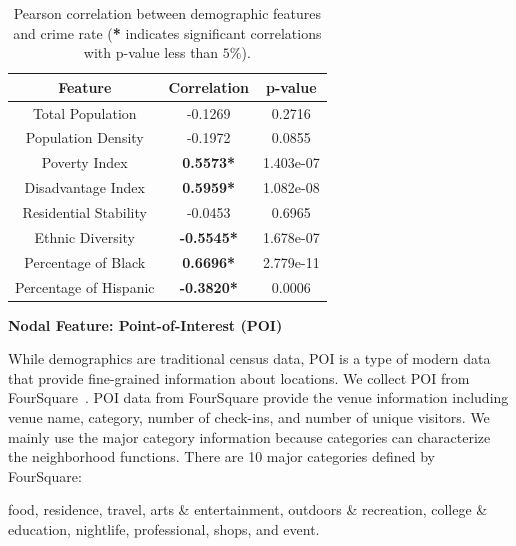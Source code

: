 \begin{table}[h]
\centering
\caption{Pearson correlation between demographic features  and crime rate (\textbf{*} indicates significant correlations with p-value less than $5\%$). }
\begin{tabular}{|c||c|c|}
\hline
Feature & Correlation & p-value \\ \hline \hline
Total Population & -0.1269 &  0.2716 \\ \hline
Population Density & -0.1972  & 0.0855 \\ \hline
Poverty Index & \textbf{0.5573*} & 1.403e-07 \\ \hline
Disadvantage Index & \textbf{0.5959*} & 1.082e-08 \\ \hline
Residential Stability  & -0.0453 &  0.6965 \\ \hline
Ethnic Diversity & \textbf{-0.5545*} &  1.678e-07 \\ \hline
Percentage of Black & \textbf{0.6696*} &  2.779e-11 \\ \hline
Percentage of Hispanic  & \textbf{-0.3820*} &  0.0006 \\ \hline
\end{tabular}
\label{tb:demo}

\end{table}







\textbf{Nodal Feature: Point-of-Interest (POI)}

While demographics are traditional census data, POI is a type of  modern data that provide fine-grained information about locations. We collect POI from FourSquare~\cite{poi-data}. POI data from FourSquare provide the venue information including venue name, category, number of check-ins, and number of unique visitors. We mainly use the major category information because categories can characterize the neighborhood functions. There are 10 major categories defined by FourSquare:

\textsf{food, residence, travel, arts \& entertainment, outdoors \& recreation, college \& education, nightlife, professional, shops, and event.}


